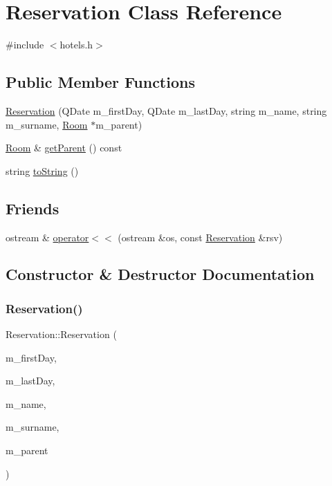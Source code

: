\hypertarget{class_reservation}{}\section{Reservation Class Reference}
\label{class_reservation}


{\ttfamily \#include $<$hotels.\+h$>$}

\subsection*{Public Member Functions}
\begin{DoxyCompactItemize}
\item 
\hyperlink{class_reservation_ac6d26e98f82dcb33a52b64719160fb82}{Reservation} (Q\+Date m\+\_\+first\+Day, Q\+Date m\+\_\+last\+Day, string m\+\_\+name, string m\+\_\+surname, \hyperlink{class_room}{Room} $\ast$m\+\_\+parent)
\item 
\hyperlink{class_room}{Room} \& \hyperlink{class_reservation_ae2c3cb8475f8649e3d44c076d6340c2c}{get\+Parent} () const
\item 
string \hyperlink{class_reservation_a7187041bfd3814ea69f0c51aabfed8ae}{to\+String} ()
\end{DoxyCompactItemize}
\subsection*{Friends}
\begin{DoxyCompactItemize}
\item 
ostream \& \hyperlink{class_reservation_ac5cc5f8866d66ef4e1c74dbc74380070}{operator$<$$<$} (ostream \&os, const \hyperlink{class_reservation}{Reservation} \&rsv)
\end{DoxyCompactItemize}


\subsection{Constructor \& Destructor Documentation}
\mbox{\label{class_reservation_ac6d26e98f82dcb33a52b64719160fb82}} 
\subsubsection{\texorpdfstring{Reservation()}{Reservation()}}
{\footnotesize\ttfamily Reservation\+::\+Reservation (\begin{DoxyParamCaption}\item[{Q\+Date}]{m\+\_\+first\+Day,  }\item[{Q\+Date}]{m\+\_\+last\+Day,  }\item[{string}]{m\+\_\+name,  }\item[{string}]{m\+\_\+surname,  }\item[{\hyperlink{class_room}{Room} $\ast$}]{m\+\_\+parent }\end{DoxyParamCaption})}

